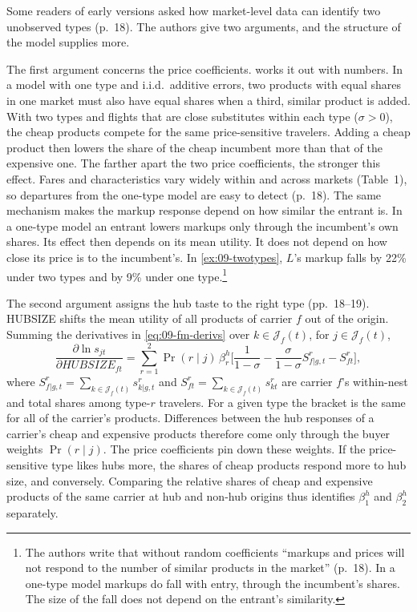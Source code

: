 Some readers of early versions asked how market-level data can identify two unobserved types (p.~18). The
authors give two arguments, and the structure of the model supplies more.

The first argument concerns the price coefficients.  works it out with numbers. In a
model with one type and i.i.d.\ additive errors, two products with equal shares in one market must also have
equal shares when a third, similar product is added. With two types and flights that are close substitutes
within each type ($\sigma>0$), the cheap products compete for the same price-sensitive travelers. Adding a
cheap product then lowers the share of the cheap incumbent more than that of the expensive one. The farther apart the two price coefficients, the stronger this effect. Fares and
characteristics vary widely within and across markets (Table~1), so departures from the one-type model are
easy to detect (p.~18). The same mechanism makes the markup response depend on how similar the entrant
is. In a one-type model an entrant lowers markups only through the incumbent's own shares. Its effect then
depends on its mean utility. It does not depend on how close its price is to the incumbent's. In \cref{ex:09-twotypes},
$L$'s markup falls by 22\% under two types and by 9\% under one type.\footnote{The authors write that without
random coefficients ``markups and prices will not respond to the number of similar products in the market''
(p.~18). In a one-type model markups do fall with entry, through the incumbent's shares. The size of the
fall does not depend on the entrant's similarity.}

The second argument assigns the hub taste to the right type (pp.~18--19). HUBSIZE shifts the mean utility of
all products of carrier $f$ out of the origin. Summing the derivatives in \eqref{eq:09-fm-derivs} over
$k\in\mathcal{J}_f(t)$, for $j\in\mathcal{J}_f(t)$,
\begin{equation}\label{eq:09-bcs-hubid}
\frac{\partial\ln s_{jt}}{\partial\mathit{HUBSIZE}_{ft}}
=\sum_{r=1}^2\Pr(r\mid j)\,\beta^h_r\Big[\frac{1}{1-\sigma}-\frac{\sigma}{1-\sigma}S^r_{f|g,t}-S^r_{ft}\Big],
\end{equation}
where $S^r_{f|g,t}=\sum_{k\in\mathcal{J}_f(t)}s^r_{k|g,t}$ and $S^r_{ft}=\sum_{k\in\mathcal{J}_f(t)}s^r_{kt}$
are carrier $f$'s within-nest and total shares among type-$r$ travelers. For a given type the bracket is the
same for all of the carrier's products. Differences between the hub responses of a carrier's cheap and
expensive products therefore come only through the buyer weights $\Pr(r\mid j)$. The price coefficients pin
down these weights. If the price-sensitive type likes hubs more, the shares of cheap products respond more
to hub size, and conversely. Comparing the relative shares of cheap and expensive products of the same
carrier at hub and non-hub origins thus identifies $\beta^h_1$ and $\beta^h_2$ separately.

